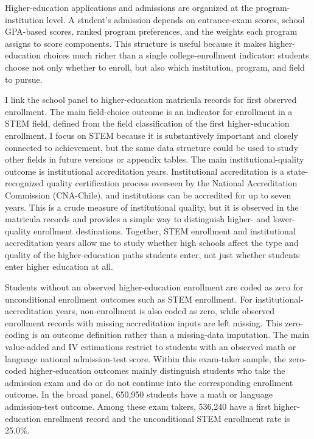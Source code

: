 \documentclass[a4paper, article, english, oneside, unknownkeysallowed, 12pt]{memoir}
\begin{document}
Higher-education applications and admissions are organized at the program-institution level.
A student's admission depends on entrance-exam scores, school GPA-based scores, ranked program preferences, and the weights each program assigns to score components.
This structure is useful because it makes higher-education choices much richer than a single college-enrollment indicator: students choose not only whether to enroll, but also which institution, program, and field to pursue.

I link the school panel to higher-education matricula records for first observed enrollment.
The main field-choice outcome is an indicator for enrollment in a STEM field, defined from the field classification of the first higher-education enrollment.
I focus on STEM because it is substantively important and closely connected to achievement, but the same data structure could be used to study other fields in future versions or appendix tables.
The main institutional-quality outcome is institutional accreditation years.
Institutional accreditation is a state-recognized quality certification process overseen by the National Accreditation Commission (CNA-Chile), and institutions can be accredited for up to seven years.
This is a crude measure of institutional quality, but it is observed in the matricula records and provides a simple way to distinguish higher- and lower-quality enrollment destinations.
Together, STEM enrollment and institutional accreditation years allow me to study whether high schools affect the type and quality of the higher-education paths students enter, not just whether students enter higher education at all.

Students without an observed higher-education enrollment are coded as zero for unconditional enrollment outcomes such as STEM enrollment.
For institutional-accreditation years, non-enrollment is also coded as zero, while observed enrollment records with missing accreditation inputs are left missing.
This zero-coding is an outcome definition rather than a missing-data imputation.
The main value-added and IV estimations restrict to students with an observed math or language national admission-test score.
Within this exam-taker sample, the zero-coded higher-education outcomes mainly distinguish students who take the admission exam and do or do not continue into the corresponding enrollment outcome.
In the broad panel, 650,950 students have a math or language admission-test outcome.
Among these exam takers, 536,240 have a first higher-education enrollment record and the unconditional STEM enrollment rate is 25.0\%.
\end{document}
